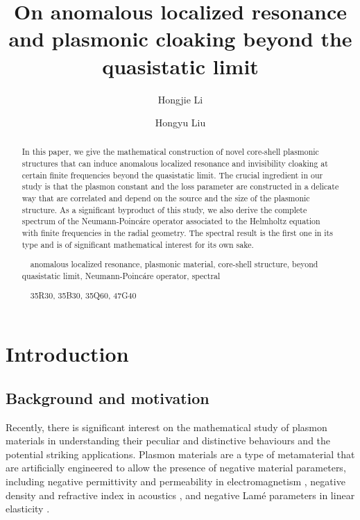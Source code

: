 \documentclass[11pt,reqno,twoside]{amsart}
\title[Plasmonic resonance and cloaking beyond the quasistatic limit]{On anomalous localized resonance and plasmonic cloaking beyond the quasistatic limit}
\author{Hongjie Li}
\author{Hongyu Liu}
\theoremstyle{definition}
\theoremstyle{remark}
\numberwithin{equation}{section}
\begin{document}
\maketitle

\begin{abstract}

In this paper, we give the mathematical construction of novel core-shell plasmonic structures that can induce anomalous localized resonance and invisibility cloaking at certain finite frequencies beyond the quasistatic limit. The crucial ingredient in our study is that the plasmon constant and the loss parameter are constructed in a delicate way that are correlated and depend on the source and the size of the plasmonic structure. As a significant byproduct of this study, we also derive the complete spectrum of the Neumann-Poinc\'are operator associated to the Helmholtz equation with finite frequencies in the radial geometry. The spectral result is the first one in its type and is of significant mathematical interest for its own sake.


\medskip

\medskip

~~anomalous localized resonance, plasmonic material,  core-shell structure, beyond quasistatic limit, Neumann-Poinc\'are operator, spectral

~~35R30, 35B30, 35Q60, 47G40

\end{abstract}

\section{Introduction}

\subsection{Background and motivation}

Recently, there is significant interest on the mathematical study of plasmon materials in understanding their peculiar and distinctive behaviours and the potential striking applications. Plasmon materials are a type of metamaterial that are artificially engineered to allow the presence of negative material parameters, including negative permittivity and permeability in electromagnetism \cite{Ack13,Ack14,ARYZ,Bos10,Brl07,CKKL,Klsap,LLL,GWM1,GWM2,GWM3,GWM4,GWM6,GWM7,GWM8,GWM9,Pen1,Pen2,Ves}, negative density and refractive index in acoustics \cite{ADM,AMRZ,AKL,KLO}, and negative Lam\'e parameters in linear elasticity \cite{AKKY,AKKY2,AKM1,AKM2,DLL,LiLiu2d,LiLiu3d,LLL2,KM,LLBW}.
\end{document}
